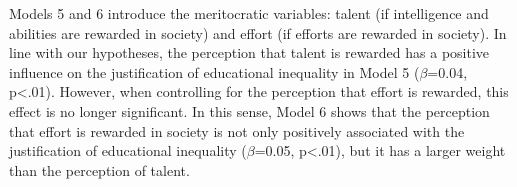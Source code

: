 \documentclass[
  12pt,
  a4paper,
]{article}
\begin{document}
Models 5 and 6 introduce the meritocratic variables: talent (if intelligence and abilities are rewarded in society) and effort (if efforts are rewarded in society). In line with our hypotheses, the perception that talent is rewarded has a positive influence on the justification of educational inequality in Model 5 (\(\beta\)=0.04, p\textless.01). However, when controlling for the perception that effort is rewarded, this effect is no longer significant. In this sense, Model 6 shows that the perception that effort is rewarded in society is not only positively associated with the justification of educational inequality (\(\beta\)=0.05, p\textless.01), but it has a larger weight than the perception of talent.

\begin{table}[!ht]
\caption{\label{tab:multilevel} Multilevel longitudinal models for the justification of inequality in education}
\begin{center}
\end{center}
\end{table}
\end{document}
